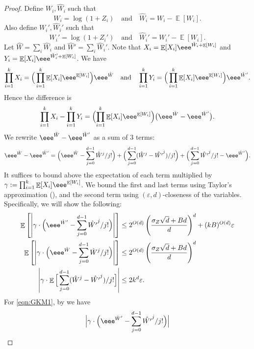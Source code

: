 \documentclass{toc}
\def\eps{\varepsilon}
\DeclarePairedDelimiter{\abs}{\lvert}{\rvert}
\DeclareMathOperator*{\E}{\mathbb{E}}                 %
\begin{document}
  \begin{proof}
    Define $W_i, \hat W_i$ such that
    \[
      W_i = \log(1 + Z_i) \quad \text{and} \quad \hat W_i = W_i - \E[W_i] .
    \]
    Also define $W_i', \hat W_i'$ such that
    \[
      W_i' = \log(1 + Z_i') \quad \text{and} \quad \hat W_i' = W_i' - \E[W_i] .
    \]
    Let $\hat W = \sum_i \hat W_i$ and $\hat W' = \sum_i \hat W_i'$.
    Note that $X_i = \E[X_i] \eee^{\hat W_i + \E[W_i]}$ and $Y_i = \E[X_i] \eee^{\hat W_i' + \E[W_i]}$.
    We have
    \[
      \prod_{i = 1}^k X_i = \Big( \prod_{i = 1}^k \E[X_i] \eee^{\E[W_i]} \Big) \eee^{\hat W}
      \quad \text{and} \quad
      \prod_{i = 1}^k Y_i = \Big( \prod_{i = 1}^k \E[X_i] \eee^{\E[W_i]} \Big) \eee^{\hat W'} .
    \]
    Hence the difference is
    \[
      \prod_{i = 1}^k X_i - \prod_{i = 1}^k Y_i
      = \Bigl( \prod_{i = 1}^k \E[X_i] \eee^{\E[W_i]} \Bigr) \bigl( \eee^{\hat W} - \eee^{\hat W'} \bigr) .
    \]
%
%
%
%
%
%
%
%
%
%
%
%
%
%
%
%
%
%
%
%
%
%
%
%
%
%
%
%
%
%
%
%
%
%
%
    We rewrite $\eee^{\hat W} - \eee^{\hat W'}$ as a sum of 3 terms:
    \[
      \eee^{\hat W} - \eee^{\hat W'}
      = \Big( \eee^{\hat W} - \sum_{j = 0}^{d-1} {\hat W}^j / j! \Big)
        + \Big( \sum_{j = 0}^{d-1} (\hat W^j - {\hat {W'}}^j) / j! \Big)
        + \Big( \sum_{j = 0}^{d-1} {\hat {W'}}^j / j! - \eee^{\hat W'} \Big) .
    \]
    It suffices to bound above the expectation of each term multiplied by $\gamma := \prod_{i = 1}^k \E[X_i] \eee^{\E[W_i]}$.
    We bound the first and last terms using Taylor's approximation (), and the second term using $(\eps, d)$-closeness of the variables.
    Specifically, we will show the following:
    \begin{align}
      \E \left[ \abs*{ \gamma \cdot \Big( \eee^{\hat W'} - \sum_{j = 0}^{d-1} {\hat {W'}}^j / j! \Big) } \right]
      &\le 2^{O(d)} \left( \frac{ \sigma_Z \sqrt{d} + Bd }{ d } \right)^d + (kB)^{O(d)} \eps \label{eqn:GKM1} \\
      \E \left[ \abs*{ \gamma \cdot \Big( \eee^{\hat W} - \sum_{j = 0}^{d-1} {\hat W}^j / j! \Big) } \right]
      &\le 2^{O(d)} \left( \frac{ \sigma_Z \sqrt{d} + Bd }{ d } \right)^d \label{eqn:GKM2} \\
      \abs*{ \gamma \cdot \E \Big[ \sum_{j = 0}^{d-1} (\hat W^j - {\hat {W'}}^j) / j! \Big] }
      &\le 2 k^d \eps .  \label{eqn:GKM3}
    \end{align}
    For \eqref{eqn:GKM1}, by  we have
    \[
      \Bigl| \gamma \cdot \Bigl( \eee^{\hat W'} - \sum_{j = 0}^{d-1} {\hat {W'}}^j / j! \Bigr) \Bigr|
\]
\end{proof}
\end{document}
